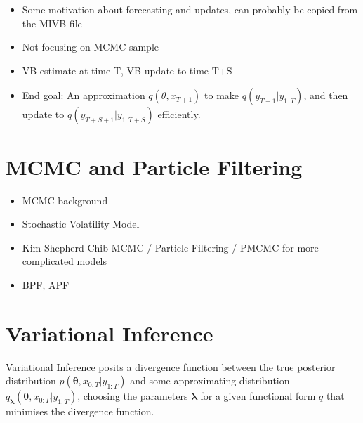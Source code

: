 \documentclass[12pt,a4paper]{article}%
\numberwithin{equation}{section}
\begin{document}
\begin{itemize}
\item Some motivation about forecasting and updates, can probably be copied from the MIVB file
\item Not focusing on MCMC sample
\item VB estimate at time T, VB update to time T+S
\item End goal: An approximation $q(\theta, x_{T+1})$ to make $q(y_{T+1} | y_{1:T})$, and then update to $q(y_{T+S+1} | y_{1:T+S})$ efficiently.
\end{itemize}

\section{MCMC and Particle Filtering}
\begin{itemize}
\item MCMC background
\item Stochastic Volatility Model
\item Kim Shepherd Chib MCMC / Particle Filtering / PMCMC for more complicated models
\item BPF, APF
\end{itemize}

\citep{Arulampalam2002}

\section{Variational Inference}


Variational Inference posits a divergence function between the true posterior distribution $p(\boldsymbol{\theta}, x_{0:T} | y_{1:T})$ and some approximating distribution $q_{\boldsymbol{\lambda}}(\boldsymbol{\theta}, x_{0:T} | y_{1:T})$, choosing the parameters $\boldsymbol{\lambda}$ for a given functional form $q$ that minimises the divergence function.
\end{document}
